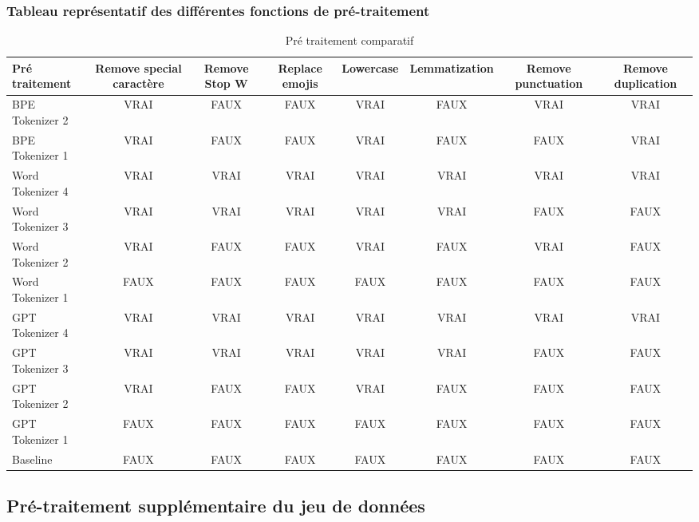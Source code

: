 \subsubsection*{Tableau représentatif des différentes fonctions de pré-traitement}
\begin{table}[ht]
    \centering
    \begin{adjustbox}{max width=\textwidth}
    \renewcommand{\arraystretch}{1.5} %
    \setlength{\tabcolsep}{6pt} %
    \begin{tabular}{|p{3.5cm}|c|c|c|c|c|c|c|}
        \hline
        \textbf{Pré traitement} & \textbf{Remove special caractère} & \textbf{Remove Stop W} & \textbf{Replace emojis} & \textbf{Lowercase} & \textbf{Lemmatization} & \textbf{Remove punctuation} & \textbf{Remove duplication} \\
        \hline
        BPE Tokenizer 2  & VRAI & FAUX & FAUX & VRAI & FAUX & VRAI & VRAI \\
        BPE Tokenizer 1  & VRAI & FAUX & FAUX & VRAI & FAUX & FAUX & VRAI \\
        Word Tokenizer 4  & VRAI & VRAI & VRAI & VRAI & VRAI & VRAI & VRAI \\
        Word Tokenizer 3 & VRAI & VRAI & VRAI & VRAI & VRAI & FAUX & FAUX \\
        Word Tokenizer 2  & VRAI & FAUX & FAUX & VRAI & FAUX & VRAI & FAUX \\
        Word Tokenizer 1  & FAUX & FAUX & FAUX & FAUX & FAUX & FAUX & FAUX \\
        GPT Tokenizer 4  & VRAI & VRAI & VRAI & VRAI & VRAI & VRAI & VRAI \\
        GPT Tokenizer 3 & VRAI & VRAI & VRAI & VRAI & VRAI & FAUX & FAUX \\
        GPT Tokenizer 2  & VRAI & FAUX & FAUX & VRAI & FAUX & FAUX & FAUX \\
        GPT Tokenizer 1 & FAUX & FAUX & FAUX & FAUX & FAUX & FAUX & FAUX \\
        Baseline & FAUX & FAUX & FAUX & FAUX & FAUX & FAUX & FAUX \\
        \hline
    \end{tabular}
    \end{adjustbox}
    \caption{Pré traitement comparatif}
    \label{tab:pre_treatment_comparative}
\end{table}

\subsection{Pré-traitement supplémentaire du jeu de données}

